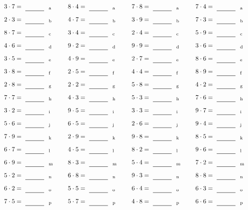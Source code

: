 \documentclass
[
  draft    = true,
  fontsize = 11pt,
  parskip  = half-
]
{scrartcl}
\begin{document}
\par\vfill\par
\begin{align*}
    \pline{3\cdot7}&=\rline{a}
  & \pline{8\cdot4}&=\rline{a}
  & \pline{7\cdot8}&=\rline{a}
  & \pline{7\cdot4}&=\rline{a} \\[1ex]
    \pline{2\cdot3}&=\rline{b}
  & \pline{4\cdot7}&=\rline{b}
  & \pline{3\cdot9}&=\rline{b}
  & \pline{7\cdot3}&=\rline{b} \\[1ex]
    \pline{8\cdot7}&=\rline{c}
  & \pline{3\cdot4}&=\rline{c}
  & \pline{2\cdot4}&=\rline{c}
  & \pline{5\cdot9}&=\rline{c} \\[1ex]
    \pline{4\cdot6}&=\rline{d}
  & \pline{9\cdot2}&=\rline{d}
  & \pline{9\cdot9}&=\rline{d}
  & \pline{3\cdot6}&=\rline{d} \\[1ex]
    \pline{3\cdot5}&=\rline{e}
  & \pline{4\cdot9}&=\rline{e}
  & \pline{2\cdot7}&=\rline{e}
  & \pline{8\cdot6}&=\rline{e} \\[1ex]
    \pline{3\cdot8}&=\rline{f}
  & \pline{2\cdot5}&=\rline{f}
  & \pline{4\cdot4}&=\rline{f}
  & \pline{8\cdot9}&=\rline{f} \\[1ex]
    \pline{2\cdot8}&=\rline{g}
  & \pline{2\cdot2}&=\rline{g}
  & \pline{5\cdot8}&=\rline{g}
  & \pline{4\cdot2}&=\rline{g} \\[1ex]
    \pline{7\cdot7}&=\rline{h}
  & \pline{4\cdot3}&=\rline{h}
  & \pline{5\cdot3}&=\rline{h}
  & \pline{7\cdot6}&=\rline{h} \\[1ex]
    \pline{3\cdot2}&=\rline{i}
  & \pline{9\cdot5}&=\rline{i}
  & \pline{3\cdot3}&=\rline{i}
  & \pline{9\cdot7}&=\rline{i} \\[1ex]
    \pline{5\cdot6}&=\rline{j}
  & \pline{6\cdot5}&=\rline{j}
  & \pline{2\cdot6}&=\rline{j}
  & \pline{9\cdot4}&=\rline{j} \\[1ex]
    \pline{7\cdot9}&=\rline{k}
  & \pline{2\cdot9}&=\rline{k}
  & \pline{9\cdot8}&=\rline{k}
  & \pline{8\cdot5}&=\rline{k} \\[1ex]
    \pline{6\cdot7}&=\rline{l}
  & \pline{4\cdot5}&=\rline{l}
  & \pline{8\cdot2}&=\rline{l}
  & \pline{9\cdot6}&=\rline{l} \\[1ex]
    \pline{6\cdot9}&=\rline{m}
  & \pline{8\cdot3}&=\rline{m}
  & \pline{5\cdot4}&=\rline{m}
  & \pline{7\cdot2}&=\rline{m} \\[1ex]
    \pline{5\cdot2}&=\rline{n}
  & \pline{6\cdot8}&=\rline{n}
  & \pline{9\cdot3}&=\rline{n}
  & \pline{8\cdot8}&=\rline{n} \\[1ex]
    \pline{6\cdot2}&=\rline{o}
  & \pline{5\cdot5}&=\rline{o}
  & \pline{6\cdot4}&=\rline{o}
  & \pline{6\cdot3}&=\rline{o} \\[1ex]
    \pline{7\cdot5}&=\rline{p}
  & \pline{5\cdot7}&=\rline{p}
  & \pline{4\cdot8}&=\rline{p}
  & \pline{6\cdot6}&=\rline{p}
\end{align*}
\end{document}
